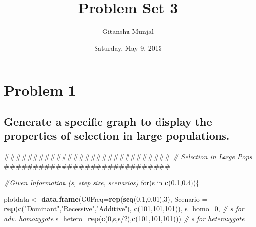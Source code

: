 \documentclass[]{article}
\title{Problem Set 3}
\author{Gitanshu Munjal}
\date{Saturday, May 9, 2015}
\newenvironment{Shaded}{\begin{snugshade}}{\end{snugshade}}
\newcommand{\KeywordTok}[1]{\textcolor[rgb]{0.13,0.29,0.53}{\textbf{{#1}}}}
\newcommand{\DataTypeTok}[1]{\textcolor[rgb]{0.13,0.29,0.53}{{#1}}}
\newcommand{\DecValTok}[1]{\textcolor[rgb]{0.00,0.00,0.81}{{#1}}}
\newcommand{\FloatTok}[1]{\textcolor[rgb]{0.00,0.00,0.81}{{#1}}}
\newcommand{\StringTok}[1]{\textcolor[rgb]{0.31,0.60,0.02}{{#1}}}
\newcommand{\CommentTok}[1]{\textcolor[rgb]{0.56,0.35,0.01}{\textit{{#1}}}}
\newcommand{\NormalTok}[1]{{#1}}
\begin{document}
\maketitle


\section{Problem 1}\label{problem-1}

\subsection{Generate a specific graph to display the properties of
selection in large
populations.}\label{generate-a-specific-graph-to-display-the-properties-of-selection-in-large-populations.}

\begin{Shaded}
\begin{Highlighting}[]
\NormalTok{#############################}
\CommentTok{# Selection in Large Pops}
\NormalTok{#############################}

\CommentTok{#Given Information (s, step size, scenarios)}
\NormalTok{for(s in }\KeywordTok{c}\NormalTok{(}\FloatTok{0.1}\NormalTok{,}\FloatTok{0.4}\NormalTok{))\{}

\NormalTok{plotdata <-}\StringTok{ }\KeywordTok{data.frame}\NormalTok{(}\DataTypeTok{G0Freq=}\KeywordTok{rep}\NormalTok{(}\KeywordTok{seq}\NormalTok{(}\DecValTok{0}\NormalTok{,}\DecValTok{1}\NormalTok{,}\FloatTok{0.01}\NormalTok{),}\DecValTok{3}\NormalTok{),}
                       \DataTypeTok{Scenario =} \KeywordTok{rep}\NormalTok{(}\KeywordTok{c}\NormalTok{(}\StringTok{"Dominant"}\NormalTok{,}\StringTok{"Recessive"}\NormalTok{,}\StringTok{"Additive"}\NormalTok{),}
                                      \KeywordTok{c}\NormalTok{(}\DecValTok{101}\NormalTok{,}\DecValTok{101}\NormalTok{,}\DecValTok{101}\NormalTok{)),}
                       \DataTypeTok{s_homo=}\DecValTok{0}\NormalTok{,                                  }\CommentTok{# s for adv. homozygote}
                       \DataTypeTok{s_hetero=}\KeywordTok{rep}\NormalTok{(}\KeywordTok{c}\NormalTok{(}\DecValTok{0}\NormalTok{,s,s/}\DecValTok{2}\NormalTok{),}\KeywordTok{c}\NormalTok{(}\DecValTok{101}\NormalTok{,}\DecValTok{101}\NormalTok{,}\DecValTok{101}\NormalTok{)))   }\CommentTok{# s for heterozygote}


\end{Highlighting}
\end{Shaded}
\end{document}
